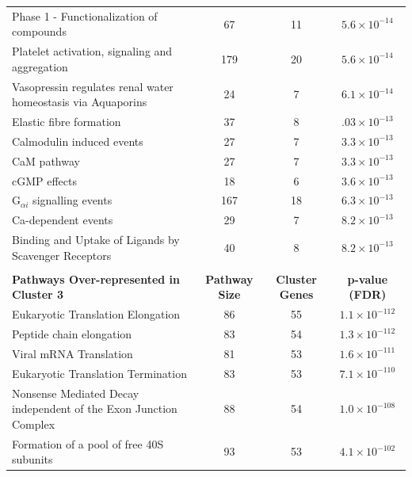 \begin{table}[!Hp]
{\begin{tabular}{lccc}
  Phase 1 - Functionalization of compounds &  67 &  11 & $5.6 \times 10^{-14}$ \\ 
  \rowcolor{Cluster_Green!15} 
  Platelet activation, signaling and aggregation & 179 &  20 & $5.6 \times 10^{-14}$ \\ 
  \rowcolor{Cluster_Green!20} 
  Vasopressin regulates renal water homeostasis via Aquaporins &  24 &   7 & $6.1 \times 10^{-14}$ \\ 
  \rowcolor{Cluster_Green!15} 
  Elastic fibre formation &  37 &   8 & $.03 \times 10^{-13}$ \\ 
  \rowcolor{Cluster_Green!20} 
  Calmodulin induced events &  27 &   7 & $3.3 \times 10^{-13}$ \\ 
  \rowcolor{Cluster_Green!15} 
  CaM pathway &  27 &   7 & $3.3 \times 10^{-13}$ \\ 
  \rowcolor{Cluster_Green!20} 
  cGMP effects &  18 &   6 & $3.6 \times 10^{-13}$ \\ 
  \rowcolor{Cluster_Green!15} 
  G$_{\alpha i}$ signalling events & 167 &  18 & $6.3 \times 10^{-13}$ \\ 
  \rowcolor{Cluster_Green!20} 
  Ca-dependent events &  29 &   7 & $8.2 \times 10^{-13}$ \\ 
  \rowcolor{Cluster_Green!15} 
  Binding and Uptake of Ligands by Scavenger Receptors &  40 &   8 & $8.2 \times 10^{-13}$ \\ 
  \hline
  \\
  \cellcolor{white} \large{\textbf{Pathways Over-represented in Cluster 3}} & \large{\textbf{Pathway Size}} & \large{\textbf{Cluster Genes}} & \large{\textbf{p-value (FDR)}} \\ %
  \hline
  \rowcolor{Cluster_Orange!30}
  Eukaryotic Translation Elongation &  86 &  55 & $1.1 \times 10^{-112}$ \\ 
  \rowcolor{Cluster_Orange!20} 
  Peptide chain elongation &  83 &  54 & $1.3 \times 10^{-112}$ \\ 
  \rowcolor{Cluster_Orange!30} 
  Viral mRNA Translation &  81 &  53 & $1.6 \times 10^{-111}$ \\ 
  \rowcolor{Cluster_Orange!20} 
  Eukaryotic Translation Termination &  83 &  53 & $7.1 \times 10^{-110}$ \\ 
  \rowcolor{Cluster_Orange!30} 
  Nonsense Mediated Decay independent of the Exon Junction Complex &  88 &  54 & $1.0 \times 10^{-108}$ \\ 
  \rowcolor{Cluster_Orange!20} 
  Formation of a pool of free 40S subunits &  93 &  53 & $4.1 \times 10^{-102}$ \\ 

\end{tabular}}
\end{table}
